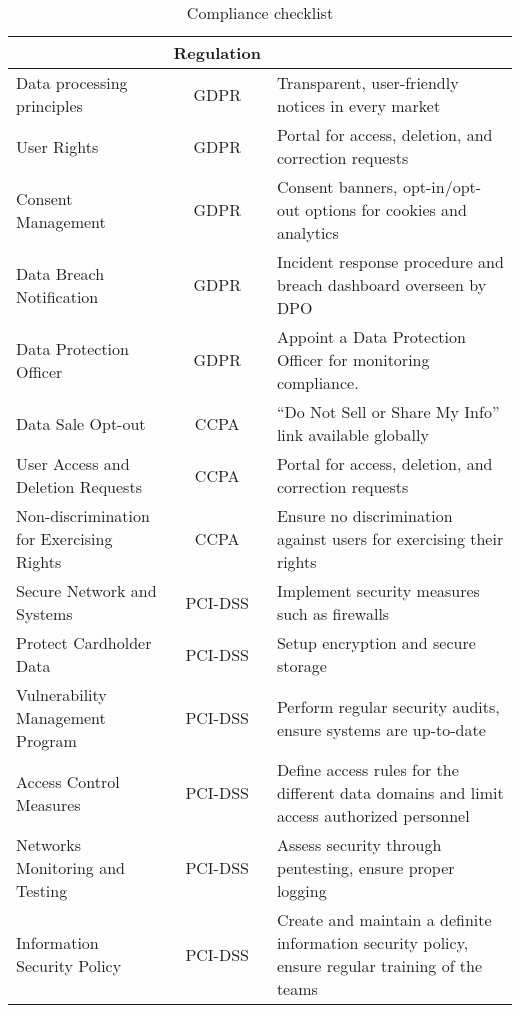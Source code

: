 \documentclass[11pt,a4paper,computermodern]{article}
\begin{document}
\begin{table}[h!]
	\centering
	\begin{threeparttable}
		\caption{Compliance checklist}
		\label{table:compliance}
		\begin{tabularx}{0.99\textwidth}{>{\arraybackslash}X c >{\arraybackslash}X}
			\toprule
			\multicolumn{1}{c}{\textbf{Requirement}} & \multicolumn{1}{c}{\textbf{Regulation}} & \multicolumn{1}{c}{\textbf{Implementation}} \\
			\midrule
			Data processing principles & GDPR & Transparent, user-friendly notices in every market \\
			User Rights & GDPR & Portal for access, deletion, and correction requests \\
			Consent Management & GDPR &  Consent banners, opt-in/opt-out options for cookies and analytics \\
			Data Breach Notification & GDPR & Incident response procedure and breach dashboard overseen by DPO \\
			Data Protection Officer & GDPR & Appoint a Data Protection Officer for monitoring compliance. \\
			Data Sale Opt-out & CCPA & “Do Not Sell or Share My Info” link available globally \\
			User Access and Deletion Requests & CCPA & Portal for access, deletion, and correction requests \\
			Non-discrimination for Exercising Rights & CCPA & Ensure no discrimination against users for exercising their rights \\
			Secure Network and Systems & PCI-DSS & Implement security measures such as firewalls \\
			Protect Cardholder Data & PCI-DSS & Setup encryption and secure storage \\
			Vulnerability Management Program & PCI-DSS & Perform regular security audits, ensure systems are up-to-date \\
			Access Control Measures & PCI-DSS & Define access rules for the different data domains and limit access authorized personnel \\
			Networks Monitoring and Testing & PCI-DSS & Assess security through pentesting, ensure proper logging \\
			Information Security Policy & PCI-DSS & Create and maintain a definite information security policy, ensure regular training of the teams \\
			\bottomrule
		\end{tabularx}
	\end{threeparttable}
\end{table}
\end{document}
